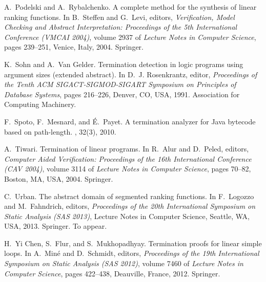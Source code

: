 \documentclass{acm_proc_article-sp}
\begin{document}
\begin{thebibliography}{10}
A.~Podelski and A.~Rybalchenko.
\newblock A complete method for the synthesis of linear ranking functions.
\newblock In B.~Steffen and G.~Levi, editors, {\em Verification, Model Checking
  and Abstract Interpretation: Proceedings of the 5th International Conference
  (VMCAI 2004)}, volume 2937 of {\em Lecture Notes in Computer Science}, pages
  239--251, Venice, Italy, 2004. Springer.

K.~Sohn and A.~{Van Gelder}.
\newblock Termination detection in logic programs using argument sizes
  (extended abstract).
\newblock In D.~J. Rosenkrantz, editor, {\em Proceedings of the Tenth {ACM}
  {SIGACT-SIGMOD-SIGART} Symposium on Principles of Database Systems}, pages
  216--226, Denver, CO, USA, 1991. Association for Computing Machinery.

F.~Spoto, F.~Mesnard, and {\'E}.~Payet.
\newblock A termination analyzer for {Java} bytecode based on path-length.
, 32(3),
  2010.

A.~Tiwari.
\newblock Termination of linear programs.
\newblock In R.~Alur and D.~Peled, editors, {\em Computer Aided Verification:
  Proceedings of the 16th International Conference (CAV 2004)}, volume 3114 of
  {\em Lecture Notes in Computer Science}, pages 70--82, Boston, MA, USA, 2004.
  Springer.

C.~Urban.
\newblock The abstract domain of segmented ranking functions.
\newblock In F.~Logozzo and M.~Fahndrich, editors, {\em Proceedings of the 20th
  International Symposium on Static Analysis (SAS 2013)}, Lecture Notes in
  Computer Science, Seattle, WA, USA, 2013. Springer.
\newblock To appear.

H.~{Yi Chen}, S.~Flur, and S.~Mukhopadhyay.
\newblock Termination proofs for linear simple loops.
\newblock In A.~Min{\'e} and D.~Schmidt, editors, {\em Proceedings of the 19th
  International Symposium on Static Analysis (SAS 2012)}, volume 7460 of {\em
  Lecture Notes in Computer Science}, pages 422--438, Deauville, France, 2012.
  Springer.

\end{thebibliography}
\end{document}
